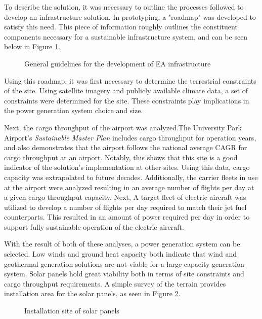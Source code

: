 \documentclass[../main.tex]{subfiles}
\begin{document}
To describe the solution, it was necessary to outline the processes followed to develop an infrastructure solution. In prototyping, a "roadmap" was developed to satisfy this need. This piece of information roughly outlines the constituent components necessary for a sustainable infrastructure system, and can be seen below in Figure \ref{fig:roadmap}.
\begin{figure}[h!]
    \centering
    \caption{General guidelines for the development of EA infrastructure}
    \label{fig:roadmap}
    \centering
\end{figure}
\FloatBarrier
Using this roadmap, it was first necessary to determine the terrestrial constraints of the site. Using satellite imagery and publicly available climate data, a set of constraints were determined for the site. These constraints play implications in the power generation system choice and size.\par
Next, the cargo throughput of the airport was analyzed.The University Park Airport's \emph{Sustainable Master Plan} includes cargo throughput for operation years, and also demonstrates that the airport follows the national average CAGR for cargo throughput at an airport. Notably, this shows that this site is a good indicator of the solution's implementation at other sites. Using this data, cargo capacity was extrapolated to future decades. Additionally, the carrier fleets in use at the airport were analyzed resulting in an average number of flights per day at a given cargo throughput capacity. Next, A target fleet of electric aircraft was utilized to develop a number of flights per day required to match their jet fuel counterparts. This resulted in an amount of power required per day in order to support fully sustainable operation of the electric aircraft.\par
With the result of both of these analyses, a power generation system can be selected. Low winds and ground heat capacity both indicate that wind and geothermal generation solutions are not viable for a large-capacity generation system. Solar panels hold great viability both in terms of site constraints and cargo throughput requirements. A simple survey of the terrain provides installation area for the solar panels, as seen in Figure \ref{fig:panelSites}.\par
\begin{figure}[h!]
    \centering
    \caption{Installation site of solar panels}
    \label{fig:panelSites}
    \centering
\end{figure}
\end{document}
